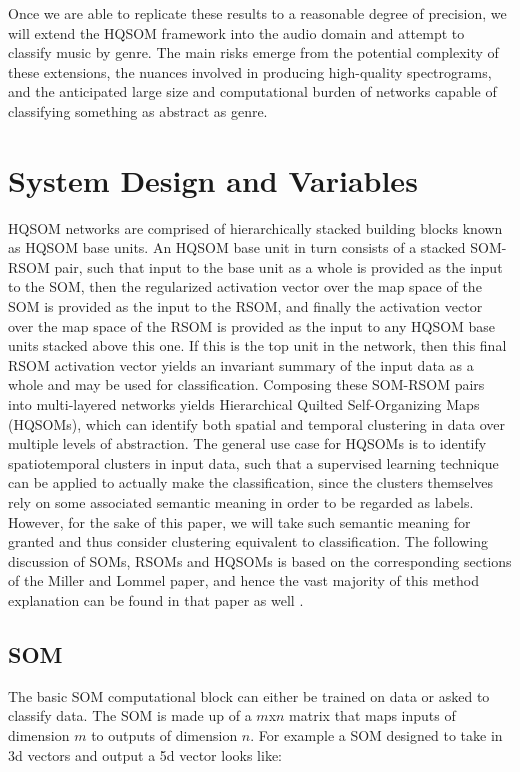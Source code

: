 \documentclass[a4paper,10pt]{article}
\begin{document}
Once we are able to replicate these results to a
reasonable degree of precision, we will extend the HQSOM framework into the audio domain and attempt
to
classify music by genre.  The main risks emerge from the potential complexity of these extensions,
the nuances involved in producing high-quality spectrograms, and the anticipated large size and
computational burden of networks capable of classifying something as abstract as genre.

\section{System Design and Variables}
HQSOM networks are comprised of hierarchically stacked building blocks known as HQSOM base units.
An HQSOM base unit in turn consists of a stacked SOM-RSOM pair, such that input to the base
unit as a whole is provided as the input to the SOM, then the regularized activation vector over the
map space of the SOM is provided
as the input to the RSOM, and finally the activation vector over the map space of the RSOM is
provided as the input to
any HQSOM base units stacked above this one.  If this is the top unit in the network, then this
final RSOM activation vector yields an invariant summary of the input data as a whole and may be
used for classification.
Composing these SOM-RSOM pairs into multi-layered networks yields Hierarchical Quilted
Self-Organizing Maps (HQSOMs), which can
identify both spatial and temporal clustering in data over multiple levels of abstraction.  The
general use case for HQSOMs is to identify spatiotemporal clusters in input data, such that a
supervised learning technique can be applied to actually make the classification, since the clusters
themselves rely on some associated semantic meaning in order to be regarded as labels.  However, for
the sake of this paper, we will take such semantic meaning for granted and thus consider
clustering equivalent to classification. The following
discussion of SOMs, RSOMs and HQSOMs is based on the corresponding sections of the Miller and Lommel
paper, and hence the vast majority of this method explanation can be found in that
paper as well \cite{HQSOM}.
\subsection{SOM}
The basic SOM computational block can either be trained on data or asked to classify data. The SOM
is made up of a $m$x$n$ matrix that maps inputs of dimension $m$ to outputs of dimension $n$.  For
example a SOM designed to take in 3d vectors and output a 5d vector looks like:
\end{document}
